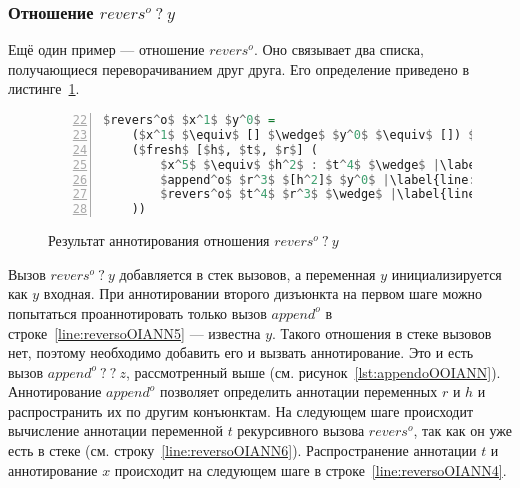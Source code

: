 
\subsubsection{Отношение $revers^o \ ? \ y$}

Ещё один пример --- отношение $revers^o$.
Оно связывает два списка, получающиеся переворачиванием друг друга.
Его определение приведено в листинге~\ref{lst:reversoOIANN}.

\begin{figure}[h!]
  \begin{center}
  \begin{minipage}{0.35\textwidth}
  \begin{lstlisting}[language=Haskell, frame=single, numbers=left,numberstyle=\small, firstnumber=22, escapechar=|]
  $revers^o$ $x^1$ $y^0$ =
    ($x^1$ $\equiv$ [] $\wedge$ $y^0$ $\equiv$ []) $\vee$ |\label{line:reversoOIANN2}|
    ($fresh$ [$h$, $t$, $r$] (
        $x^5$ $\equiv$ $h^2$ : $t^4$ $\wedge$ |\label{line:reversoOIANN4}|
        $append^o$ $r^3$ $[h^2]$ $y^0$ |\label{line:reversoOIANN5}|
        $revers^o$ $t^4$ $r^3$ $\wedge$ |\label{line:reversoOIANN6}|
    ))
    \end{lstlisting}
  \end{minipage}
  \end{center}
  \caption{Результат аннотирования отношения $revers^o \ ? \ y$}
  \label{lst:reversoOIANN}
\end{figure}

Вызов $revers^o \ ? \ y$ добавляется в стек вызовов, а переменная $y$ инициализируется как $y$ входная.
При аннотировании второго дизъюнкта на первом шаге можно попытаться проаннотировать только вызов $append^o$ в строке~\ref{line:reversoOIANN5} --- известна $y$.
Такого отношения в стеке вызовов нет, поэтому необходимо добавить его и вызвать аннотирование.
Это и есть вызов $append^o \ ? \ ? \ z$, рассмотренный выше (см. рисунок~\ref{lst:appendoOOIANN}).
Аннотирование $append^o$ позволяет определить аннотации переменных $r$ и $h$ и распространить их по другим конъюнктам.
На следующем шаге происходит вычисление аннотации переменной $t$ рекурсивного вызова $revers^o$, так как он уже есть в стеке (см. строку~\ref{line:reversoOIANN6}).
Распространение аннотации $t$ и аннотирование $x$ происходит на следующем шаге в строке~\ref{line:reversoOIANN4}.
